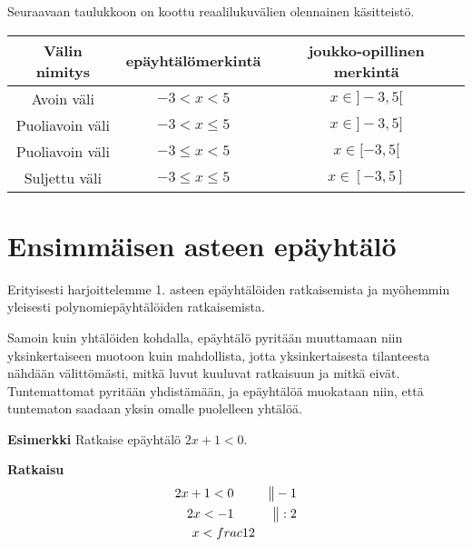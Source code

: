 Seuraavaan taulukkoon on koottu reaalilukuvälien olennainen käsitteistö.

\begin{tabular}{|c|c|c|}
\hline 
Välin nimitys & epäyhtälömerkintä & joukko-opillinen merkintä \\ 
\hline 
Avoin väli & $-3<x<5$ & $x \in ]-3,5[$ \\ 
\hline 
Puoliavoin väli & $-3<x \leq 5$ & $x \in ]-3,5]$ \\ 
\hline 
Puoliavoin väli & $-3\leq x < 5$ & $x \in [-3,5[$ \\ 
\hline 
Suljettu väli & $-3\leq x \leq 5$ & $x \in [-3,5]$ \\ 
\hline 
\end{tabular} 


\section{Ensimmäisen asteen epäyhtälö}

Erityisesti harjoittelemme 1. asteen epäyhtälöiden ratkaisemista ja myöhemmin yleisesti polynomiepäyhtälöiden ratkaisemista.

Samoin kuin yhtälöiden kohdalla, epäyhtälö pyritään muuttamaan niin yksinkertaiseen muotoon kuin mahdollista, jotta yksinkertaisesta tilanteesta nähdään välittömästi, mitkä luvut kuuluvat ratkaisuun ja mitkä eivät. Tuntemattomat pyritään yhdistämään, ja epäyhtälöä muokataan niin, että tuntematon saadaan yksin omalle puolelleen yhtälöä.


\textbf{Esimerkki}
Ratkaise epäyhtälö $2x+1<0$.

\textbf{Ratkaisu}
\begin{align*}
2x+1<0 \ \ \ \ \ &&\big\| -1 \\
2x<-1 \ \ \ \ \ &&\big\| :2 \\
x<\-frac{1}{2}
\end{align*}

